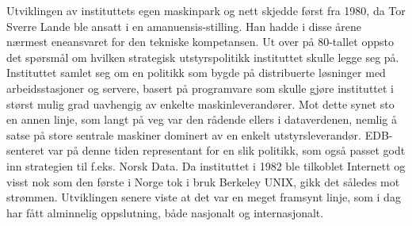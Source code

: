 Utviklingen av instituttets egen maskinpark og nett skjedde først fra 1980, da Tor Sverre Lande ble ansatt i en amanuensis-stilling. Han hadde i disse årene nærmest eneansvaret for den tekniske kompetansen. Ut over på 80-tallet oppsto det spørsmål om hvilken strategisk utstyrspolitikk instituttet skulle legge seg på. Instituttet samlet seg om en politikk som bygde på distribuerte løsninger med arbeidsstasjoner og servere, basert på programvare som skulle gjøre instituttet i størst mulig grad uavhengig av enkelte maskinleverandører. Mot dette synet sto en annen linje, som langt på veg var den rådende ellers i dataverdenen, nemlig å satse på store sentrale maskiner dominert av en enkelt utstyrsleverandør. EDB-senteret var på denne tiden representant for en slik politikk, som også passet godt inn strategien til f.eks. Norsk Data. Da instituttet i 1982 ble tilkoblet Internett og visst nok som den første i Norge tok i bruk Berkeley UNIX, gikk det således mot strømmen. Utviklingen senere viste at det var en meget framsynt linje, som i dag har fått alminnelig oppslutning, både nasjonalt og internasjonalt.
